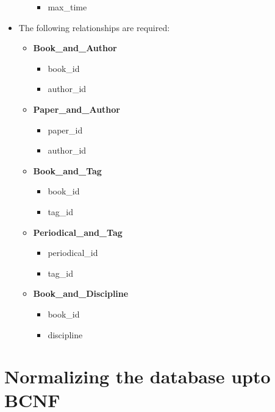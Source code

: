 \documentclass{article}
\begin{document}
\begin{itemize}
\begin{itemize}
\begin{itemize}
                    \item max\_time
                \end{itemize}
        \end{itemize}
    \item The following relationships are required:
        \begin{itemize}
            \item \textbf{Book\_and\_Author}
                \begin{itemize}
                    \item {\color{blue}book\_id}
                    \item {\color{blue}author\_id}
                \end{itemize}
            \item \textbf{Paper\_and\_Author}
                \begin{itemize}
                    \item {\color{blue}paper\_id}
                    \item {\color{blue}author\_id}
                \end{itemize}
            \item \textbf{Book\_and\_Tag}
                \begin{itemize}
                    \item {\color{blue}book\_id}
                    \item {\color{blue}tag\_id}
                \end{itemize}
            \item \textbf{Periodical\_and\_Tag}
                \begin{itemize}
                    \item {\color{blue}periodical\_id}
                    \item {\color{blue}tag\_id}
                \end{itemize}
            \item \textbf{{\color{green}Book\_and\_Discipline}}
                \begin{itemize}
                    \item {\color{blue}book\_id}
                    \item {\color{blue}discipline}
                \end{itemize}
        \end{itemize}
\end{itemize}

\section{Normalizing the database upto BCNF}
\end{document}
